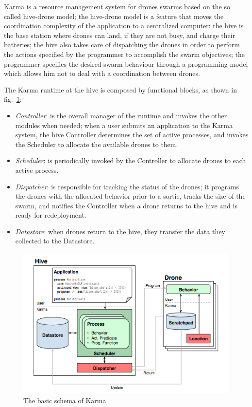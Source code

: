 Karma\cite{karma} is a resource management system for drones swarms based on the so called hive-drone model; the hive-drone model is a feature that moves the coordination complexity of the application to a centralized computer: the hive is the base station where drones can land, if they are not busy, and charge their batteries; the hive also takes care of dispatching the drones in order to perform the actions specified by the programmer to accomplish the swarm objectives; the programmer specifies the desired swarm behaviour through a programming model which allows him not to deal with a coordination between drones.

The Karma\cite{karma} runtime at the hive is composed by functional blocks, as shown in fig.~\ref{fig:karma}:

\begin{itemize}
\itemsep2pt
\item{
\textit{Controller}: is the overall manager of the runtime and invokes the other modules when needed; when a user submits an application to the Karma system, the hive Controller determines the set of active processes, and invokes the Scheduler to allocate the available drones to them.
}
\item{
\textit{Scheduler}: is periodically invoked by the Controller to allocate drones to each active process.
}
\item{
\textit{Dispatcher}:  is responsible for tracking the status of the drones; it programs the drones with the allocated behavior prior to a sortie, tracks the size of the swarm, and notifies the Controller when a drone returns to the hive and is ready for redeployment.
}
\item{
\textit{Datastore}: when drones return to the hive, they transfer the data they collected to the Datastore.
}
\end{itemize}


\begin{figure}[htbp]
  \centering
  \includegraphics[width=\linewidth]{pictures/Karma.png}
  \caption{The basic schema of Karma}
  \label{fig:karma}
\end{figure}

